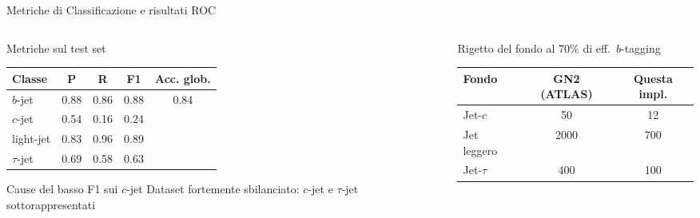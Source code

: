 \documentclass[aspectratio=169, 10pt]{beamer}
\begin{document}
\begin{frame}{Metriche di Classificazione e risultati ROC}
    \begin{columns}[T]
        \begin{column}{0.46\textwidth}
            \begin{block}{Metriche sul test set}
                \centering\vspace{2pt}
                \begin{tabular}{lcccc}
                    \toprule
                    Classe       & P    & R    & F1   & Acc. glob. \\
                    \midrule
                    $b$-jet      & 0.88 & 0.86 & 0.88 & \multirow{4}{*}{0.84} \\
                    $c$-jet      & 0.54 & 0.16 & 0.24 & \\
                    light-jet    & 0.83 & 0.96 & 0.89 & \\
                    $\tau$-jet   & 0.69 & 0.58 & 0.63 & \\
                    \bottomrule
                \end{tabular}
                \vspace{2pt}
            \end{block}
            \begin{block}{Cause del basso F1 sui $c$-jet}
                Dataset fortemente sbilanciato: $c$-jet e $\tau$-jet sottorappresentati
            \end{block}
        \end{column}
        \begin{column}{0.50\textwidth}
            \begin{block}{Rigetto del fondo al 70\% di eff.\ $b$-tagging}
                \centering\vspace{2pt}
                \begin{tabular}{lcc}
                    \toprule
                    Fondo       & GN2 (ATLAS) & Questa impl. \\
                    \midrule
                    Jet-$c$     & 50          & 12  \\
                    Jet leggero & 2000        & 700 \\
                    Jet-$\tau$  & 400         & 100 \\
                    \bottomrule
                \end{tabular}
                \vspace{6pt}
            \end{block}

\end{column}
\end{columns}
\end{frame}
\end{document}
